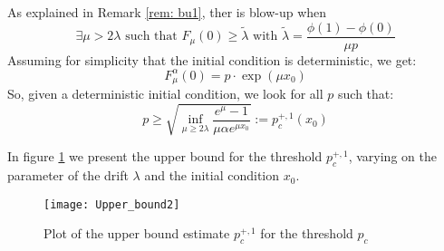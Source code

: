 \begin{remark}
As explained in Remark \ref{rem: bu1}, ther is blow-up when
\[\exists \mu>2\lambda\text{ such that }F_\mu(0)\geq \tilde{\lambda}\text{ with }\tilde{\lambda}=\frac{\phi(1)-\phi(0)}{\mu p} \]
Assuming for simplicity that the initial condition is deterministic, we get:
\[F^\alpha_\mu(0)=p\cdot\exp(\mu x_0)\]
So, given a deterministic initial condition, we look for all $p$ such that:
\[p\geq \sqrt{\inf_{\mu\geq 2\lambda}\frac{e^\mu-1}{\mu\alpha e^{\mu x_0}}}:=p^{+,1}_c(x_0)\]

In figure \ref{fig:2} we present the upper bound for the threshold $p^{+,1}_c$, varying on the parameter of the drift $\lambda$ and the initial condition $x_0$.

\begin{figure}\label{fig:2}
\centering
\texttt{[image: Upper\_bound2]}
\caption{Plot of the upper bound estimate $p^{+,1}_c$ for the threshold $p_c$}
\end{figure}
\end{remark}


